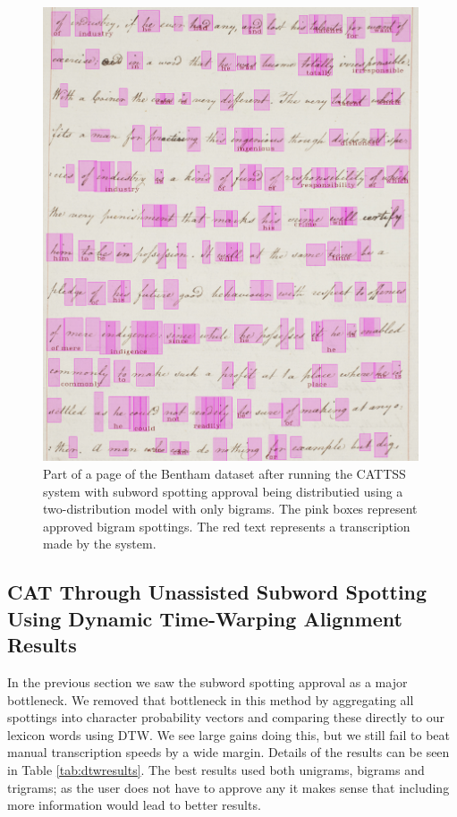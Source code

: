 \documentclass[ms,electronic,twosidetoc,letterpaper,chaptercenter,parttop,lof,lot]{byumsphd}
\begin{document}
\begin{figure}
    \centering
    \includegraphics[width=0.99\textwidth]{aftercattss}
    \caption{Part of a page of the Bentham dataset after running the CATTSS system with subword spotting approval being distributied using a two-distribution model with only bigrams. The pink boxes represent approved bigram spottings. The red text represents a transcription made by the system.}
    \label{fig:aftercattss}
\end{figure}




\subsection{CAT Through Unassisted Subword Spotting Using Dynamic Time-Warping Alignment Results}

In the previous section we saw the subword spotting approval as a major bottleneck. We removed that bottleneck in this method by aggregating all spottings into character probability vectors and comparing these directly to our lexicon words using DTW. We see large gains doing this, but we still fail to beat manual transcription speeds by a wide margin. Details of the results can be seen in Table \ref{tab:dtwresults}. The best results used both unigrams, bigrams and trigrams; as the user does not have to approve any it makes sense that including more information would lead to better results.
\end{document}
